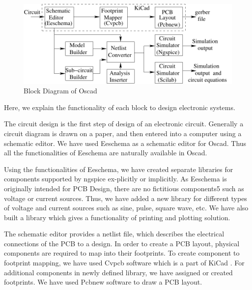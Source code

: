 \begin{figure}[h]%
\begin{center}
\includegraphics[width=1\linewidth]{figures/oscadBD-eps-converted-to.pdf}%
\caption{Block Diagram of Oscad}
\label{iit}
\end{center}
\end{figure}
Here, we explain the functionality of each block to design electronic systems.

The circuit design is the first step of design of an electronic circuit. Generally a circuit diagram is drawn on a paper, and then entered into a computer using a schematic editor. We have used Eeschema as a schematic editor for Oscad. Thus all the functionalities of Eeschema are naturally available in Oscad.

Using the functionalities of Eeschema, we have created separate libraries for components supported by ngspice ex-plicitly or implicitly. As Eeschema is originally intended for PCB Design, there are no fictitious components5 such as voltage or current sources. Thus, we have added a new library for different types of voltage and current sources such as sine, pulse, square wave, etc. We have also built a library
which gives a functionality of printing and plotting solution.

The schematic editor provides a netlist file, which describes the electrical connections of the PCB to a design. In order to create a PCB layout, physical components are required to map into their footprints. To create component to footprint mapping, we have used Cvpcb software which is a part of KiCad . For additional components in newly defined library, we have assigned or created footprints. We have used Pcbnew software to draw a PCB layout.


